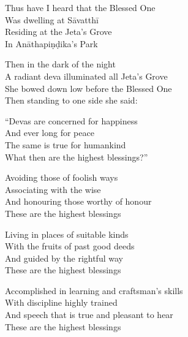 \begin{english-only}
  Thus have I heard that the Blessed One\\
  Was dwelling at Sāvatthī\ifdigital\makeatletter\hyperlink{endnote47-appendix}\makeatother\fi\\
  Residing at the Jeta's Grove\\
  In Anāthapiṇḍika's Park
\end{english-only}


\begin{english-only}
  Then in the dark of the night\\
  A radiant deva illuminated all Jeta's Grove\\
  She bowed down low before the Blessed One\\
  Then standing to one side she said:
\end{english-only}

\begin{english-only}
  ``Devas are concerned for happiness\\
  And ever long for peace\\
  The same is true for humankind\\
  What then are the highest blessings?''
\end{english-only}

\begin{english-only}
  Avoiding those of foolish ways\\
  Associating with the wise\\
  And honouring those worthy of honour\\
  These are the highest blessings
\end{english-only}

\ifninebythirteen\clearpage\fi

\begin{english-only}
  Living in places of suitable kinds\\
  With the fruits of past good deeds\\
  And guided by the rightful way\\
  These are the highest blessings
\end{english-only}

\ifbfive\clearpage\fi
\ifafive\clearpage\fi

\begin{english-only}
  Accomplished in learning and craftsman's skills\\
  With discipline highly trained\\
  And speech that is true and pleasant to hear\\
  These are the highest blessings
\end{english-only}


